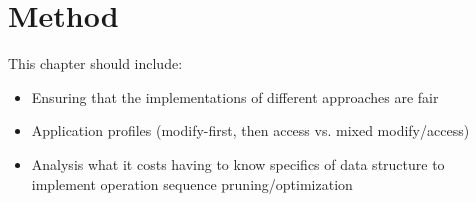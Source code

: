 \chapter{Method}

This chapter should include:
\begin{itemize}
  \item Ensuring that the implementations of different approaches are fair
  \item Application profiles (modify-first, then access vs. mixed modify/access)
  \item Analysis what it costs having to know specifics of data structure to
  implement operation sequence pruning/optimization
\end{itemize}
